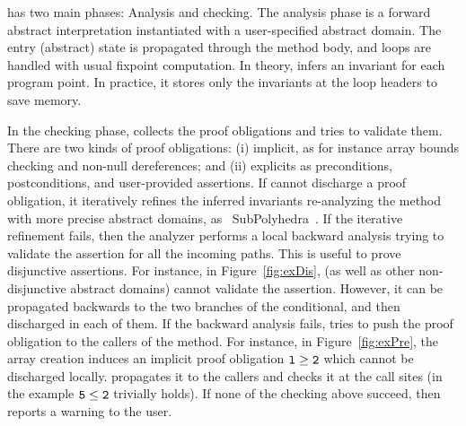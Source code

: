 \documentclass{elsart}
\begin{document}
\Clousot{} has two main phases: Analysis and checking.
The analysis phase is a forward abstract interpretation instantiated
with a user-specified abstract domain.
The entry (abstract) state is propagated through the method body, and
loops are handled with usual fixpoint computation. 
In theory, \Clousot{} infers an invariant for each program point.
In practice, it stores only the invariants at the loop headers to save
memory.

In the checking phase, \Clousot{} collects the proof obligations and
tries to validate them.
There are two kinds of proof obligations: (i) implicit, as for
instance array bounds checking and non-null dereferences; and (ii)
explicits as preconditions, postconditions, and user-provided assertions.
If \Clousot{} cannot discharge a proof obligation, it iteratively refines the
inferred invariants re-analyzing the method with more precise abstract
domains, as \eg\ SubPolyhedra~\cite{LavironLogozzo09}.
If the iterative refinement fails, then the analyzer performs a local
backward analysis  trying to validate the assertion for all the
incoming paths. 
This is useful to prove disjunctive assertions.
For instance, in Figure~\ref{fig:exDis}, \Pentagons{} (as well as other
non-disjunctive abstract domains) cannot validate the assertion. 
However, it can be propagated backwards to the two branches of the
conditional, and then discharged in each of them.
If the backward analysis fails, \Clousot{} tries to push the proof
obligation to the callers of the method.
For instance, in Figure~\ref{fig:exPre}, the array creation induces an
implicit proof obligation $\mathtt{l \geq 2}$ which cannot be discharged
locally.
 \Clousot{} propagates it to the callers and checks it at the call sites (in the example
 $\mathtt{5 \leq 2}$ trivially holds).
If none of the checking above succeed, then \Clousot{} reports a
warning to the user.
\end{document}
